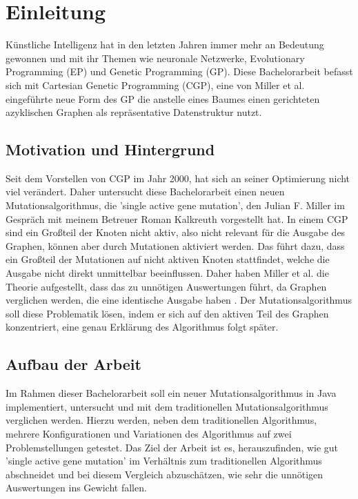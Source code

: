 \chapter{Einleitung}
\label{cha:einleitung}

Künstliche Intelligenz hat in den letzten Jahren immer mehr an Bedeutung gewonnen und mit ihr Themen wie neuronale Netzwerke, Evolutionary Programming (EP) und Genetic Programming (GP). 
Diese Bachelorarbeit befasst sich mit Cartesian Genetic Programming (CGP), eine von Miller et al. \cite{miller:2000:CGP} eingeführte neue Form des GP die anstelle eines Baumes einen gerichteten azyklischen Graphen als repräsentative Datenstruktur nutzt.


\section{Motivation und Hintergrund}
\label{sec:motivation_und_hintergrund}

Seit dem Vorstellen von CGP im Jahr 2000, hat sich an seiner Optimierung nicht viel verändert. 
Daher untersucht diese Bachelorarbeit einen neuen Mutationsalgorithmus, die 'single active gene mutation', den Julian F. Miller im Gespräch mit meinem Betreuer Roman Kalkreuth vorgestellt hat. 
In einem CGP sind ein Großteil der Knoten nicht aktiv, also nicht relevant für die Ausgabe des Graphen, können aber durch Mutationen aktiviert werden. 
Das führt dazu, dass ein Großteil der Mutationen auf nicht aktiven Knoten stattfindet, welche die Ausgabe nicht direkt unmittelbar beeinflussen. 
Daher haben Miller et al. die Theorie aufgestellt, dass das zu unnötigen Auswertungen führt, da Graphen verglichen werden, die eine identische Ausgabe haben
\cite{journals/tec/MillerS06}. 
Der Mutationsalgorithmus soll diese Problematik lösen, indem er sich auf den aktiven Teil des Graphen konzentriert, eine genau Erklärung des Algorithmus folgt später. 




\section{Aufbau der Arbeit}
\label{sec:aufbau}

Im Rahmen dieser Bachelorarbeit soll ein neuer Mutationsalgorithmus in Java implementiert, untersucht und mit dem traditionellen Mutationsalgorithmus verglichen werden. Hierzu werden, neben dem traditionellen Algorithmus, mehrere Konfigurationen und Variationen des Algorithmus auf zwei Problemstellungen getestet. Das Ziel der Arbeit ist es, herauszufinden, wie gut 'single active gene mutation' im Verhältnis zum traditionellen Algorithmus abschneidet und bei diesem Vergleich abzuschätzen, wie sehr die unnötigen Auswertungen ins Gewicht fallen.


